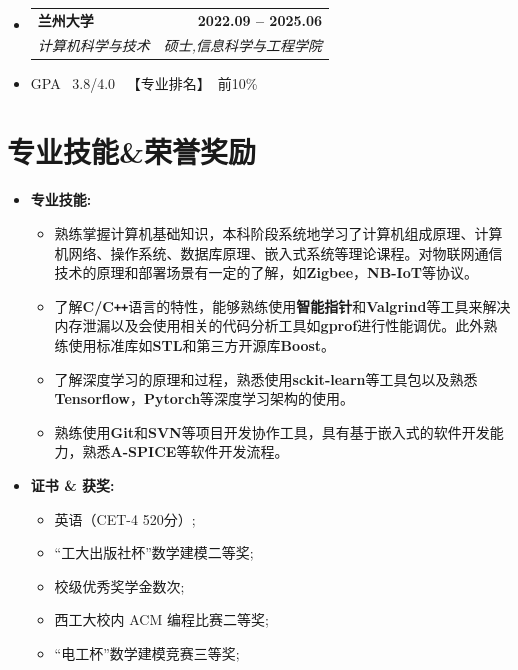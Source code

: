 \documentclass[letterpaper,11pt]{article}
\makeatletter
\newcommand{\resumeItem}[1]{	
	\item\small{
		{#1 \vspace{-2pt}}
	}
}
\newcommand{\resumeSubheading}[4]{
	\vspace{-2pt}\item
	\begin{tabular*}{1.0\textwidth}[t]{l@{\extracolsep{\fill}}r}
		\textbf{\CJKfamily{STSong}#1} & \textbf{\small #2} \\
		\textit{\small\CJKfamily{KaiTi}#3} & \textit{\small #4} \\
	\end{tabular*}\vspace{-7pt}
	
}
\newcommand{\resumeSubHeadingListStart}{\begin{itemize}[leftmargin=0.0in, label={}]}
\newcommand{\resumeSubHeadingListEnd}{\end{itemize}}
\newcommand{\resumeItemListStart}{\begin{itemize}}
\newcommand{\resumeItemListEnd}{\end{itemize}\vspace{-5pt}}
\makeatother
\begin{document}
	\resumeSubHeadingListStart
	\resumeSubheading
	{兰州大学}{2022.09 -- 2025.06}
	{计算机科学与技术}{硕士,信息科学与工程学院}
	\vspace{-2pt}
	\resumeSubHeadingListEnd
	
	\resumeItemListStart	
	\resumeItem{GPA \ 3.8/4.0 \ 【专业排名】\ 前10\%}
	\resumeItemListEnd
	
	\vspace{-8pt}
	
	\section{专业技能\&荣誉奖励}

	\begin{itemize}[leftmargin=0in, label={}]
	\item{\textbf{专业技能:}{
			\vspace{-6pt}
			\begin{itemize}[leftmargin=0.15in]
				\small \item 熟练掌握计算机基础知识，本科阶段系统地学习了计算机组成原理、计算机网络、操作系统、数据库原理、嵌入式系统等理论课程。对物联网通信技术的原理和部署场景有一定的了解，如\textbf{Zigbee}，\textbf{NB-IoT}等协议。
				\small \item
				了解\textbf{C/C\texttt{++}}语言的特性，能够熟练使用\textbf{智能指针}和\textbf{Valgrind}等工具来解决内存泄漏以及会使用相关的代码分析工具如\textbf{gprof}进行性能调优。此外熟练使用标准库如\textbf{STL}和第三方开源库\textbf{Boost}。
				\small \item 
				了解深度学习的原理和过程，熟悉使用\textbf{sckit-learn}等工具包以及熟悉\textbf{Tensorflow}，\textbf{Pytorch}等深度学习架构的使用。
				\small \item 
				熟练使用\textbf{Git}和\textbf{SVN}等项目开发协作工具，具有基于嵌入式的软件开发能力，熟悉\textbf{A-SPICE}等软件开发流程。
			\end{itemize}}
		}
		
	\vspace{-8pt}
	
	\item{\textbf{证书 \& 获奖:}{
			\vspace{3pt}
			\begin{multicols}{2}
				\begin{itemize}[itemsep=-5pt, parsep=5pt]
					\small \item 英语（CET-4 520分）;
					\small \item “工大出版社杯”数学建模二等奖;
					\small \item 校级优秀奖学金数次;
					\small \item 西工大校内 ACM 编程比赛二等奖;
					\small \item “电工杯”数学建模竞赛三等奖;
				\end{itemize}
			\end{multicols}}
		}		
			

\end{itemize}
\end{document}
